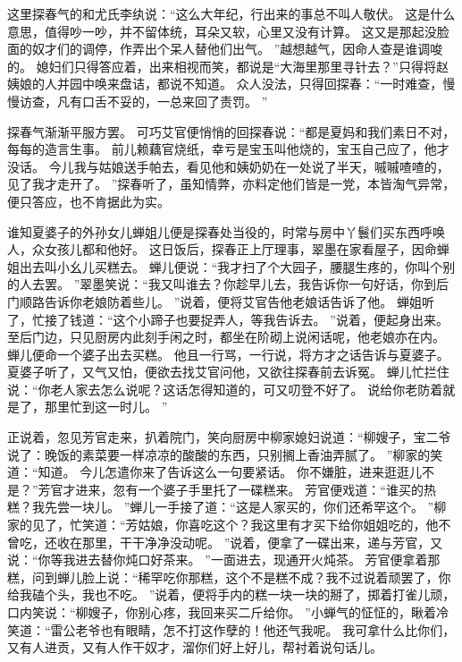 \par
这里探春气的和尤氏李纨说：“这么大年纪，行出来的事总不叫人敬伏。
这是什么意思，值得吵一吵，并不留体统，耳朵又软，心里又没有计算。
这又是那起没脸面的奴才们的调停，作弄出个呆人替他们出气。
”越想越气，因命人查是谁调唆的。
媳妇们只得答应着，出来相视而笑，都说是“大海里那里寻针去？”只得将赵姨娘的人并园中唤来盘诘，都说不知道。
众人没法，只得回探春：“一时难查，慢慢访查，凡有口舌不妥的，一总来回了责罚。
”\par
探春气渐渐平服方罢。
可巧艾官便悄悄的回探春说：“都是夏妈和我们素日不对，每每的造言生事。
前儿赖藕官烧纸，幸亏是宝玉叫他烧的，宝玉自己应了，他才没话。
今儿我与姑娘送手帕去，看见他和姨奶奶在一处说了半天，嘁嘁喳喳的，见了我才走开了。
”探春听了，虽知情弊，亦料定他们皆是一党，本皆淘气异常，便只答应，也不肯据此为实。
\par
谁知夏婆子的外孙女儿蝉姐儿便是探春处当役的，时常与房中丫鬟们买东西呼唤人，众女孩儿都和他好。
这日饭后，探春正上厅理事，翠墨在家看屋子，因命蝉姐出去叫小幺儿买糕去。
蝉儿便说：“我才扫了个大园子，腰腿生疼的，你叫个别的人去罢。
”翠墨笑说：“我又叫谁去？你趁早儿去，我告诉你一句好话，你到后门顺路告诉你老娘防着些儿。
”说着，便将艾官告他老娘话告诉了他。
蝉姐听了，忙接了钱道：“这个小蹄子也要捉弄人，等我告诉去。
”说着，便起身出来。
至后门边，只见厨房内此刻手闲之时，都坐在阶砌上说闲话呢，他老娘亦在内。
蝉儿便命一个婆子出去买糕。
他且一行骂，一行说，将方才之话告诉与夏婆子。
夏婆子听了，又气又怕，便欲去找艾官问他，又欲往探春前去诉冤。
蝉儿忙拦住说：“你老人家去怎么说呢？这话怎得知道的，可又叨登不好了。
说给你老防着就是了，那里忙到这一时儿。
”\par
正说着，忽见芳官走来，扒着院门，笑向厨房中柳家媳妇说道：“柳嫂子，宝二爷说了：晚饭的素菜要一样凉凉的酸酸的东西，只别搁上香油弄腻了。
”柳家的笑道：“知道。
今儿怎遣你来了告诉这么一句要紧话。
你不嫌脏，进来逛逛儿不是？”芳官才进来，忽有一个婆子手里托了一碟糕来。
芳官便戏道：“谁买的热糕？我先尝一块儿。
”蝉儿一手接了道：“这是人家买的，你们还希罕这个。
”柳家的见了，忙笑道：“芳姑娘，你喜吃这个？我这里有才买下给你姐姐吃的，他不曾吃，还收在那里，干干净净没动呢。
”说着，便拿了一碟出来，递与芳官，又说：“你等我进去替你炖口好茶来。
”一面进去，现通开火炖茶。
芳官便拿着那糕，问到蝉儿脸上说：“稀罕吃你那糕，这个不是糕不成？我不过说着顽罢了，你给我磕个头，我也不吃。
”说着，便将手内的糕一块一块的掰了，掷着打雀儿顽，口内笑说：“柳嫂子，你别心疼，我回来买二斤给你。
”小蝉气的怔怔的，瞅着冷笑道：“雷公老爷也有眼睛，怎不打这作孽的！他还气我呢。
我可拿什么比你们，又有人进贡，又有人作干奴才，溜你们好上好儿，帮衬着说句话儿。
